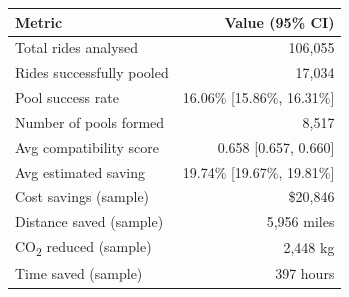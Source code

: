 \begin{tabularx}{\columnwidth}{>{\raggedright\arraybackslash}X r}
\toprule
\textbf{Metric} & \textbf{Value (95\% CI)} \\
\midrule
Total rides analysed & 106,055 \\
Rides successfully pooled & 17,034 \\
Pool success rate & 16.06\% [15.86\%, 16.31\%] \\
Number of pools formed & 8,517 \\
Avg compatibility score & 0.658 [0.657, 0.660] \\
Avg estimated saving & 19.74\% [19.67\%, 19.81\%] \\
Cost savings (sample) & \$20,846 \\
Distance saved (sample) & 5,956 miles \\
CO\textsubscript{2} reduced (sample) & 2,448 kg \\
Time saved (sample) & 397 hours \\
\bottomrule
\end{tabularx}
